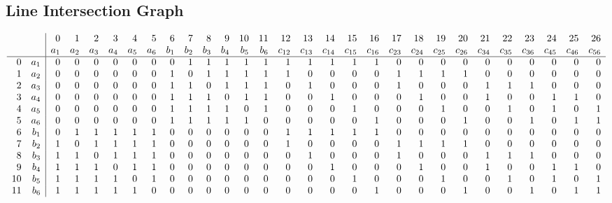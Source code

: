\documentclass{article}
\begin{document}
{\subsection*{Line Intersection Graph}
{\arraycolsep=1pt
$$
\begin{array}{rr|*{27}r}
 &  & 0 & 1 & 2 & 3 & 4 & 5 & 6 & 7 & 8 & 9 & 10 & 11 & 12 & 13 & 14 & 15 & 16 & 17 & 18 & 19 & 20 & 21 & 22 & 23 & 24 & 25 & 26\\
 &  & a_{1} & a_{2} & a_{3} & a_{4} & a_{5} & a_{6} & b_{1} & b_{2} & b_{3} & b_{4} & b_{5} & b_{6} & c_{12} & c_{13} & c_{14} & c_{15} & c_{16} & c_{23} & c_{24} & c_{25} & c_{26} & c_{34} & c_{35} & c_{36} & c_{45} & c_{46} & c_{56}\\
\hline
0 & a_{1} & 0 & 0 & 0 & 0 & 0 & 0 & 0 & 1 & 1 & 1 & 1 & 1 & 1 & 1 & 1 & 1 & 1 & 0 & 0 & 0 & 0 & 0 & 0 & 0 & 0 & 0 & 0\\
1 & a_{2} & 0 & 0 & 0 & 0 & 0 & 0 & 1 & 0 & 1 & 1 & 1 & 1 & 1 & 0 & 0 & 0 & 0 & 1 & 1 & 1 & 1 & 0 & 0 & 0 & 0 & 0 & 0\\
2 & a_{3} & 0 & 0 & 0 & 0 & 0 & 0 & 1 & 1 & 0 & 1 & 1 & 1 & 0 & 1 & 0 & 0 & 0 & 1 & 0 & 0 & 0 & 1 & 1 & 1 & 0 & 0 & 0\\
3 & a_{4} & 0 & 0 & 0 & 0 & 0 & 0 & 1 & 1 & 1 & 0 & 1 & 1 & 0 & 0 & 1 & 0 & 0 & 0 & 1 & 0 & 0 & 1 & 0 & 0 & 1 & 1 & 0\\
4 & a_{5} & 0 & 0 & 0 & 0 & 0 & 0 & 1 & 1 & 1 & 1 & 0 & 1 & 0 & 0 & 0 & 1 & 0 & 0 & 0 & 1 & 0 & 0 & 1 & 0 & 1 & 0 & 1\\
5 & a_{6} & 0 & 0 & 0 & 0 & 0 & 0 & 1 & 1 & 1 & 1 & 1 & 0 & 0 & 0 & 0 & 0 & 1 & 0 & 0 & 0 & 1 & 0 & 0 & 1 & 0 & 1 & 1\\
6 & b_{1} & 0 & 1 & 1 & 1 & 1 & 1 & 0 & 0 & 0 & 0 & 0 & 0 & 1 & 1 & 1 & 1 & 1 & 0 & 0 & 0 & 0 & 0 & 0 & 0 & 0 & 0 & 0\\
7 & b_{2} & 1 & 0 & 1 & 1 & 1 & 1 & 0 & 0 & 0 & 0 & 0 & 0 & 1 & 0 & 0 & 0 & 0 & 1 & 1 & 1 & 1 & 0 & 0 & 0 & 0 & 0 & 0\\
8 & b_{3} & 1 & 1 & 0 & 1 & 1 & 1 & 0 & 0 & 0 & 0 & 0 & 0 & 0 & 1 & 0 & 0 & 0 & 1 & 0 & 0 & 0 & 1 & 1 & 1 & 0 & 0 & 0\\
9 & b_{4} & 1 & 1 & 1 & 0 & 1 & 1 & 0 & 0 & 0 & 0 & 0 & 0 & 0 & 0 & 1 & 0 & 0 & 0 & 1 & 0 & 0 & 1 & 0 & 0 & 1 & 1 & 0\\
10 & b_{5} & 1 & 1 & 1 & 1 & 0 & 1 & 0 & 0 & 0 & 0 & 0 & 0 & 0 & 0 & 0 & 1 & 0 & 0 & 0 & 1 & 0 & 0 & 1 & 0 & 1 & 0 & 1\\
11 & b_{6} & 1 & 1 & 1 & 1 & 1 & 0 & 0 & 0 & 0 & 0 & 0 & 0 & 0 & 0 & 0 & 0 & 1 & 0 & 0 & 0 & 1 & 0 & 0 & 1 & 0 & 1 & 1\\

\end{array}$$}}
\end{document}
